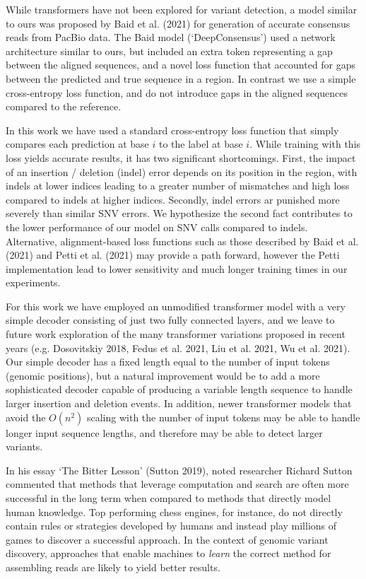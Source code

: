 \documentclass[]{article}
\begin{document}
While transformers have not been explored for variant detection, a model similar to ours was proposed by Baid et al. (2021) for generation of accurate consensus reads from PacBio data. The Baid model (`DeepConsensus') used a network architecture similar to ours, but included an extra token representing a gap between the aligned sequences, and a novel loss function that accounted for gaps between the predicted and true sequence in a region. In contrast we use a simple cross-entropy loss function, and do not introduce gaps in the aligned sequences compared to the reference. 

In this work we have used a standard cross-entropy loss function that simply compares each prediction at base $i$ to the label at base $i$. While training with this loss yields accurate results, it has two significant shortcomings. First, the impact of an insertion / deletion (indel) error depends on its position in the region, with indels at lower indices leading to a greater number of mismatches and high loss compared to indels at higher indices. Secondly, indel errors ar punished more severely than similar SNV errors. We hypothesize the second fact contributes to the lower performance of our model on SNV calls compared to indels. Alternative, alignment-based loss functions such as those described by Baid et al. (2021) and Petti et al. (2021) may provide a path forward, however the Petti implementation lead to lower sensitivity and much longer training times in our experiments. 

For this work we have employed an unmodified transformer model with a very simple decoder consisting of just two fully connected layers, and we leave to future work exploration of the many transformer variations proposed in recent years (e.g. Dosovitskiy 2018, Fedus et al. 2021, Liu et al. 2021, Wu et al. 2021). Our simple decoder has a fixed length equal to the number of input tokens (genomic positions), but a natural improvement would be to add a more sophisticated decoder capable of producing a variable length sequence to handle larger insertion and deletion events.  In addition, newer transformer models that avoid the $O(n^2)$ scaling with the number of input tokens may be able to handle longer input sequence lengths, and therefore may be able to detect larger variants. 

In his essay `The Bitter Lesson' (Sutton 2019), noted researcher Richard Sutton commented that methods that leverage computation and search are often more successful in the long term when compared to methods that directly model human knowledge. Top performing chess engines, for instance, do not directly contain rules or strategies developed by humans and instead play millions of games to discover a successful approach. In the context of genomic variant discovery, approaches that enable machines to \textit{learn} the correct method for assembling reads are likely to yield better results.  
\end{document}
